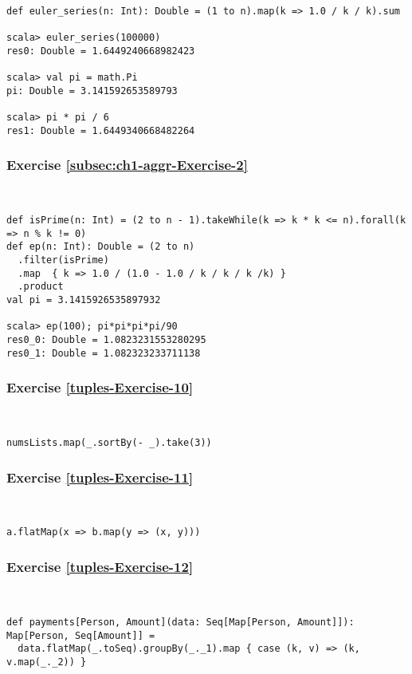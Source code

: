 ~

\begin{lstlisting}
def euler_series(n: Int): Double = (1 to n).map(k => 1.0 / k / k).sum

scala> euler_series(100000)
res0: Double = 1.6449240668982423

scala> val pi = math.Pi
pi: Double = 3.141592653589793

scala> pi * pi / 6
res1: Double = 1.6449340668482264 
\end{lstlisting}


\subsubsection*{Exercise \ref{subsec:ch1-aggr-Exercise-2}}

~
\begin{lstlisting}
def isPrime(n: Int) = (2 to n - 1).takeWhile(k => k * k <= n).forall(k => n % k != 0)
def ep(n: Int): Double = (2 to n)
  .filter(isPrime)
  .map  { k => 1.0 / (1.0 - 1.0 / k / k / k /k) }
  .product
val pi = 3.1415926535897932

scala> ep(100); pi*pi*pi*pi/90
res0_0: Double = 1.0823231553280295
res0_1: Double = 1.082323233711138 
\end{lstlisting}



\subsubsection*{Exercise \ref{tuples-Exercise-10}}

~
\begin{lstlisting}
numsLists.map(_.sortBy(- _).take(3))
\end{lstlisting}


\subsubsection*{Exercise \ref{tuples-Exercise-11}}

~
\begin{lstlisting}
a.flatMap(x => b.map(y => (x, y)))
\end{lstlisting}


\subsubsection*{Exercise \ref{tuples-Exercise-12}}

~
\begin{lstlisting}
def payments[Person, Amount](data: Seq[Map[Person, Amount]]): Map[Person, Seq[Amount]] =
  data.flatMap(_.toSeq).groupBy(_._1).map { case (k, v) => (k, v.map(_._2)) }
\end{lstlisting}


